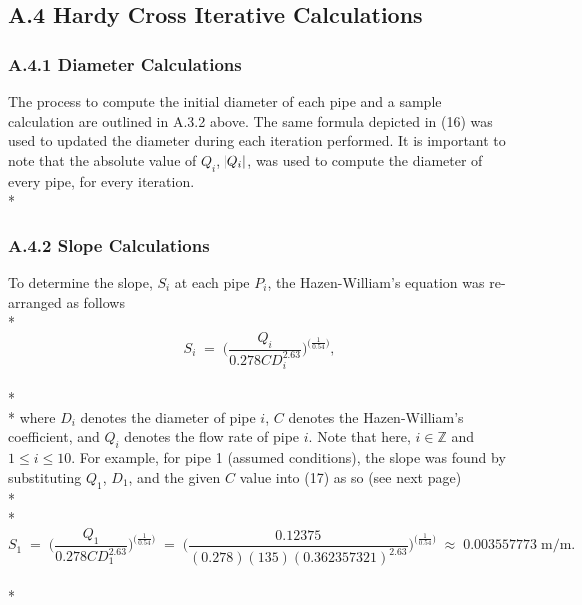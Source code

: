 \documentclass[]{article}
\begin{document}
\subsection{A.4 Hardy Cross Iterative Calculations}
\subsubsection{A.4.1 Diameter Calculations}
The process to compute the initial diameter of each pipe and a sample calculation are outlined in A.3.2 above. The same formula depicted in (16) was used to updated the diameter during each iteration performed. It is important to note that the absolute value of $Q_i$, $\abs{Q_i}$, was used to compute the diameter of every pipe, for every iteration. \\* 
\subsubsection{A.4.2 Slope Calculations}
To determine the slope, $S_i$ at each pipe $P_i$, the Hazen-William's equation was re-arranged as follows \\* 
\begin{equation}
S_i \; = \; \Bigg(\dfrac{Q_i}{0.278CD_i^{2.63}}\Bigg)^{\big(\frac{1}{0.54}\big)},
\end{equation} \\* \\* 
where $D_i$ denotes the diameter of pipe $i$, $C$ denotes the Hazen-William's coefficient, and $Q_i$ denotes the flow rate of pipe $i$. Note that here, $i \in \mathbb{Z}$ and $1 \leq i \leq 10$. For example, for pipe 1 (assumed conditions), the slope was found by substituting $Q_1$, $D_1$, and the given $C$ value into (17) as so (see next page) \\* \\* 
\begin{equation}
S_1 \; = \; \Bigg(\dfrac{Q_1}{0.278CD_1^{2.63}}\Bigg)^{\big(\frac{1}{0.54}\big)} \; = \; \Bigg(\dfrac{0.12375}{(0.278)(135)(0.362357321)^{2.63}}\Bigg)^{\big(\frac{1}{0.54}\big)} \; \approx \; 0.003557773 \; \text{m/m}.
\end{equation} \\*
\end{document}
